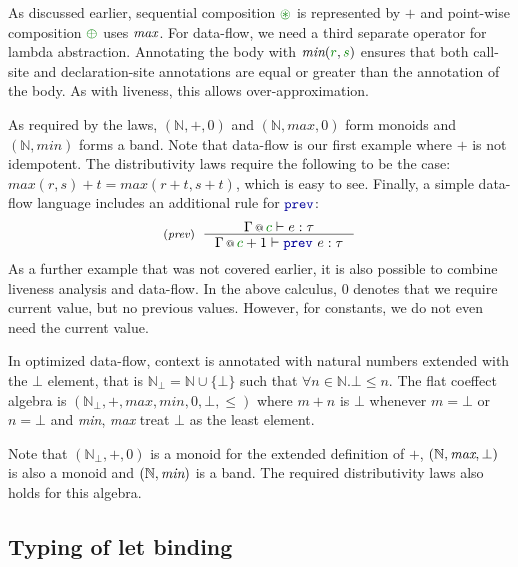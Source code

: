 \noindent
As discussed earlier, sequential composition $\cseq$ is represented by $+$ and point-wise 
composition $\cpar$ uses $\emph{max}$. For data-flow, we need a third separate operator for
lambda abstraction. Annotating the body with $\emph{min}(\cclrd{r}, \cclrd{s})$ ensures that
both call-site and declaration-site annotations are equal or greater than the annotation 
of the body. As with liveness, this allows over-approximation. 

As required by the laws, $(\mathbb{N}, +, 0)$ and $(\mathbb{N}, \mathit{max}, 0)$ form monoids
and $(\mathbb{N}, \mathit{min})$ forms a band. Note that data-flow is our first example where 
$+$ is not idempotent. The distributivity laws require the following to be the case:
$\mathit{max}(r,s) + t = \mathit{max}(r+t, s+t)$, which is easy to see. Finally, a simple 
data-flow language includes an additional rule for $\kvd{prev}$:
%
\begin{equation*}
\tyrule{prev}
  { \coctx{\Gamma}{\cclrd{c}} \vdash e : \tau }
  { \coctx{\Gamma}{\cclrd{c}+1} \vdash \kvd{prev}~e : \tau }
\end{equation*}
%
As a further example that was not covered earlier, it is also possible to combine liveness analysis
and data-flow. In the above calculus, $0$ denotes that we require current value, but no previous
values. However, for constants, we do not even need the current value.

\begin{example}
In optimized data-flow, context is annotated with natural numbers extended with the $\bot$ element,
that is $\mathbb{N}_{\bot} = \mathbb{N} \cup \{\bot \}$ such that $\forall n \in \mathbb{N}. \bot \leq n$.
The flat coeffect algebra is $(\mathbb{N}_{\bot}, +, \mathit{max}, \mathit{min}, 0, \bot, \leq)$
where $m + n$ is $\bot$ whenever $m=\bot$ or $n=\bot$ and \emph{min}, \emph{max} treat $\bot$ as the
least element.
\end{example}

\noindent
Note that $(\mathbb{N}_{\bot}, +, 0)$ is a monoid for the extended definition of $+$,
$(\mathbb{N}, \emph{max}, \bot)$ is also a monoid and $(\mathbb{N}, \emph{min})$ is a band.
The required distributivity laws also holds for this algebra.


\subsection{Typing of let binding}
\label{sec:flat-calculus-let}

